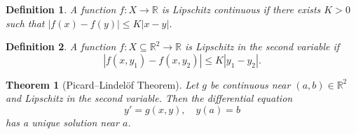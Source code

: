 \documentclass{article}
\newtheorem{theorem}{Theorem}
\newtheorem{definition}{Definition}
\begin{document}
\begin{definition}
A function $f: X \to \mathbb{R}$ is \emph{Lipschitz continuous} if there exists $K > 0$ such that $|f(x) - f(y)| \leq K|x - y|$.
\end{definition}

\begin{definition}
A function $f: X \subseteq \mathbb{R}^2 \to \mathbb{R}$ is \emph{Lipschitz in the second variable} if
\[
|f(x, y_1) - f(x, y_2)| \leq K |y_1 - y_2|.
\]
\end{definition}

\begin{theorem}[Picard–Lindelöf Theorem]
Let $g$ be continuous near $(a, b) \in \mathbb{R}^2$ and Lipschitz in the second variable. Then the differential equation
\[
y' = g(x, y), \quad y(a) = b
\]
has a unique solution near $a$.
\end{theorem}
\end{document}
